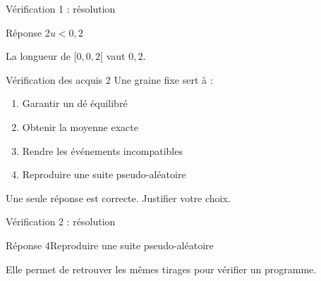 \documentclass[aspectratio=169,12pt]{beamer}
\begin{document}
\renewcommand{\slidekind}{COMPRENDRE LA RÉPONSE}\begin{frame}[t]{Vérification 1 : résolution}
\begin{block}{Réponse 2}$u<0,2$\end{block}\medskip La longueur de $[0,0,2[$ vaut $0,2$.\end{frame}
\renewcommand{\slidekind}{À VOUS DE JOUER}\begin{frame}[t]{Vérification des acquis 2}
Une graine fixe sert à :\begin{enumerate}
\item Garantir un dé équilibré
\item Obtenir la moyenne exacte
\item Rendre les événements incompatibles
\item Reproduire une suite pseudo-aléatoire
\end{enumerate}\medskip Une seule réponse est correcte. Justifier votre choix.\end{frame}
\renewcommand{\slidekind}{COMPRENDRE LA RÉPONSE}\begin{frame}[t]{Vérification 2 : résolution}
\begin{block}{Réponse 4}Reproduire une suite pseudo-aléatoire\end{block}\medskip Elle permet de retrouver les mêmes tirages pour vérifier un programme.\end{frame}
\end{document}
